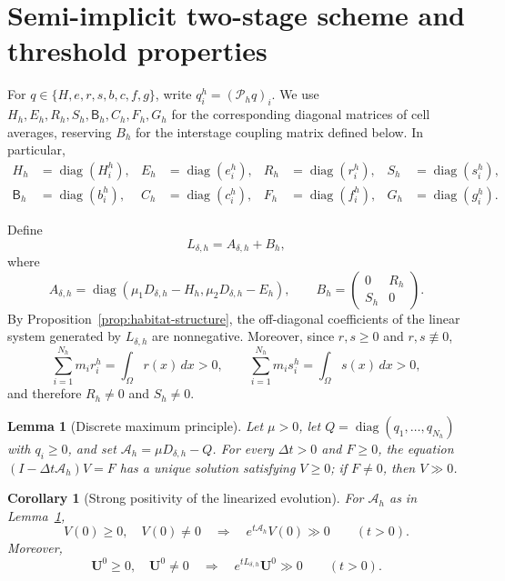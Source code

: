 \documentclass[11pt]{article}
\newtheorem{lemma}[theorem]{Lemma}
\newtheorem{corollary}[theorem]{Corollary}
\theoremstyle{definition}
\newcommand{\diag}{\operatorname{diag}}
\newcommand{\U}{\bm U}
\begin{document}
\section{Semi-implicit two-stage scheme and threshold properties}
\label{sec:scheme}

For $q\in\{H,e,r,s,b,c,f,g\}$, write $q_i^h=(\mathcal P_hq)_i$.  We use
$H_h,E_h,R_h,S_h,\mathsf B_h,C_h,F_h,G_h$ for the corresponding diagonal
matrices of cell averages, reserving $B_h$ for the interstage coupling
matrix defined below.  In particular,
\[
\begin{aligned}
 H_h&=\diag(H_i^h),& E_h&=\diag(e_i^h),&
 R_h&=\diag(r_i^h),& S_h&=\diag(s_i^h),\\
 \mathsf B_h&=\diag(b_i^h),& C_h&=\diag(c_i^h),&
 F_h&=\diag(f_i^h),& G_h&=\diag(g_i^h).
\end{aligned}
\]

Define
\begin{equation}
\label{eq:Lh}
 L_{\delta,h}=A_{\delta,h}+B_h,
\end{equation}
where
\begin{equation}
\label{eq:split}
 A_{\delta,h}
 =\diag(\mu_1D_{\delta,h}-H_h,
         \mu_2D_{\delta,h}-E_h),
 \qquad
 B_h=
 \begin{pmatrix}
 0&R_h\\
 S_h&0
 \end{pmatrix}.
\end{equation}
By Proposition~\ref{prop:habitat-structure}, the off-diagonal coefficients
of the linear system generated by $L_{\delta,h}$ are nonnegative.  Moreover,
since $r,s\ge0$ and $r,s\not\equiv0$,
\[
 \sum_{i=1}^{N_h}m_i r_i^h
 =
 \int_\Omega r(x)\,dx>0,
 \qquad
 \sum_{i=1}^{N_h}m_i s_i^h
 =
 \int_\Omega s(x)\,dx>0,
\]
and therefore $R_h\ne0$ and $S_h\ne0$.

\begin{lemma}[Discrete maximum principle]
\label{lem:discrete-maximum}
Let $\mu>0$, let $Q=\diag(q_1,\ldots,q_{N_h})$ with $q_i\ge0$, and set $\mathcal A_h=\mu D_{\delta,h}-Q$.  For every $\Delta t>0$ and $F\ge0$, the equation $(I-\Delta t\mathcal A_h)V=F$ has a unique solution satisfying $V\ge0$; if $F\ne0$, then $V\gg0$.
\end{lemma}

\begin{corollary}[Strong positivity of the linearized evolution]
\label{cor:strong-positive-linear}
For $\mathcal A_h$ as in Lemma~\ref{lem:discrete-maximum},
\[
 V(0)\ge0,\quad V(0)\ne0
 \quad\Longrightarrow\quad
 e^{t\mathcal A_h}V(0)\gg0
 \qquad(t>0).
\]
Moreover,
\begin{equation}
\label{eq:strong-positive-linear}
 \U^0\ge0,\quad \U^0\ne0
 \quad\Longrightarrow\quad
 e^{tL_{\delta,h}}\U^0\gg0
 \qquad(t>0).
\end{equation}
\end{corollary}
\end{document}
